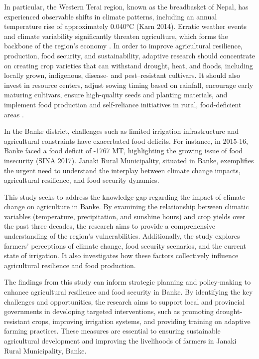 In particular, the Western Terai region, known as the breadbasket of Nepal, has experienced observable shifts in climate patterns, including an annual temperature rise of approximately 0.040°C (Karn 2014). Erratic weather events and climate variability significantly threaten agriculture, which forms the backbone of the region's economy \parencite{factors_dahal_2021}.  In order to improve agricultural resilience, production, food security, and sustainability, adaptive research should concentrate on creating crop varieties that can withstand drought, heat, and floods, including locally grown, indigenous, disease- and pest--resistant cultivars. It should also invest in resource centers, adjust sowing timing based on rainfall, encourage early maturing cultivars, ensure high-quality seeds and planting materials, and implement food production and self-reliance initiatives in rural, food-deficient areas \parencite{khanalFactorsMotivatingFarmers2021}.

In the Banke district, challenges such as limited irrigation infrastructure and agricultural constraints have exacerbated food deficits. For instance, in 2015-16, Banke faced a food deficit of -1767 MT, highlighting the growing issue of food insecurity (SINA 2017). Janaki Rural Municipality, situated in Banke, exemplifies the urgent need to understand the interplay between climate change impacts, agricultural resilience, and food security dynamics. 

This study seeks to address the knowledge gap regarding the impact of climate change on agriculture in Banke. By examining the relationship between climatic variables (temperature, precipitation, and sunshine hours) and crop yields over the past three decades, the research aims to provide a comprehensive understanding of the region's vulnerabilities. Additionally, the study explores farmers' perceptions of climate change, food security scenarios, and the current state of irrigation. It also investigates how these factors collectively influence agricultural resilience and food production.

The findings from this study can inform strategic planning and policy-making to enhance agricultural resilience and food security in Banke. By identifying the key challenges and opportunities, the research aims to support local and provincial governments in developing targeted interventions, such as promoting drought-resistant crops, improving irrigation systems, and providing training on adaptive farming practices. These measures are essential to ensuring sustainable agricultural development and improving the livelihoods of farmers in Janaki Rural Municipality, Banke.
